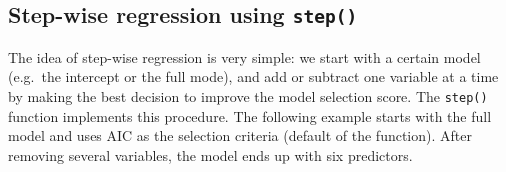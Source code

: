 \documentclass[
]{book}
\theoremstyle{definition}
\theoremstyle{definition}
\theoremstyle{definition}
\theoremstyle{definition}
\theoremstyle{remark}
\begin{document}
\hypertarget{step-wise-regression-using-step}{%
\subsection{\texorpdfstring{Step-wise regression using \texttt{step()}}{Step-wise regression using step()}}\label{step-wise-regression-using-step}}

The idea of step-wise regression is very simple: we start with a certain model (e.g.~the intercept or the full mode), and add or subtract one variable at a time by making the best decision to improve the model selection score. The \texttt{step()} function implements this procedure. The following example starts with the full model and uses AIC as the selection criteria (default of the function). After removing several variables, the model ends up with six predictors.
\end{document}
